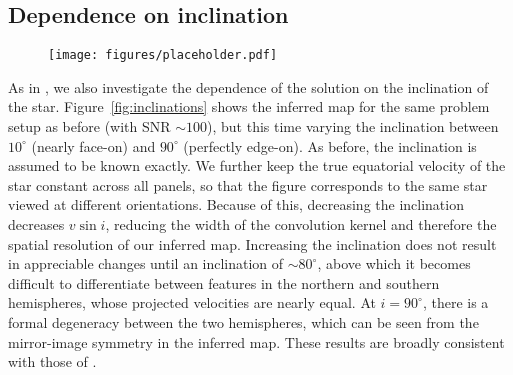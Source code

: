 \documentclass[modern]{aastex62}
\begin{document}
\subsection{Dependence on inclination}
\label{sec:inc}
%
\begin{figure}[p!]
    \begin{centering}
        \texttt{[image: figures/placeholder.pdf]} %
    \end{centering}
\end{figure}
As in \citet{Vogt1987},
we also investigate the dependence of the solution on the inclination
of the star.
Figure~\ref{fig:inclinations} shows the inferred map for the same problem
setup as before (with SNR $\sim 100$), but this time varying the
inclination between $10^\circ$ (nearly face-on) and $90^\circ$ (perfectly
edge-on). As before, the inclination is assumed to be known exactly. We
further keep the true equatorial velocity of the star constant across
all panels, so that the figure corresponds to the same star viewed at
different orientations. Because of this, decreasing the inclination
decreases $v\sin i$, reducing the width of the convolution kernel and
therefore the spatial resolution of our inferred map. Increasing the
inclination does not result in appreciable changes until an inclination of
$\sim 80^\circ$, above which it becomes difficult to differentiate between
features in the northern and southern hemispheres, whose projected
velocities are nearly equal. At $i = 90^\circ$, there is a formal
degeneracy between the two hemispheres, which can be seen from the
mirror-image symmetry in the inferred map. These results are broadly consistent
with those of \citet{Vogt1987}.
\end{document}
